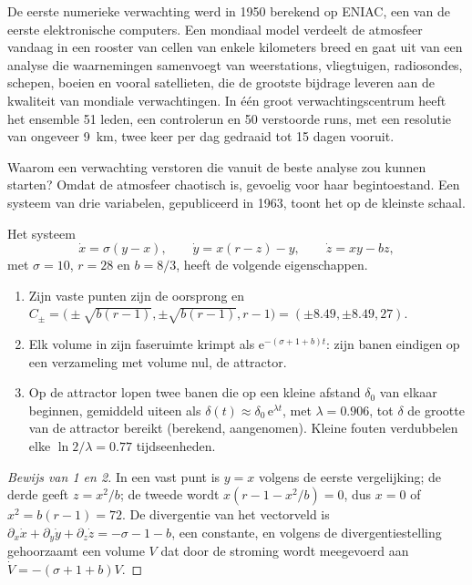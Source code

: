 De eerste numerieke verwachting werd in 1950 berekend op ENIAC, een van de eerste elektronische
computers. Een mondiaal model verdeelt de atmosfeer vandaag in een rooster van cellen van enkele kilometers
breed en gaat uit van een analyse die waarnemingen samenvoegt van weerstations, vliegtuigen,
radiosondes, schepen, boeien en vooral satellieten, die de grootste bijdrage leveren aan de
kwaliteit van mondiale verwachtingen. In één groot verwachtingscentrum heeft het ensemble
51 leden, een controlerun en 50 verstoorde runs, met een resolutie van ongeveer \qty{9}{km}, twee keer
per dag gedraaid tot 15 dagen vooruit.

Waarom een verwachting verstoren die vanuit de beste analyse zou kunnen starten? Omdat de atmosfeer
chaotisch is, gevoelig voor haar begintoestand. Een systeem van drie variabelen, gepubliceerd in 1963, toont het
op de kleinste schaal.

\begin{proposition}\label{prop:b2:weather-systems:lorenz}
Het systeem
\[
  \dot x = \sigma(y - x), \qquad \dot y = x(r - z) - y, \qquad \dot z = xy - bz,
\]
met $\sigma = 10$, $r = 28$ en $b = 8/3$, heeft de volgende eigenschappen.
\begin{enumerate}
  \item Zijn vaste punten zijn de oorsprong en $C_\pm = \bigl(\pm\sqrt{b(r - 1)}, \pm\sqrt{b(r - 1)},
        r - 1\bigr) = (\pm 8.49, \pm 8.49, 27)$.
  \item Elk volume in zijn faseruimte krimpt als $\mathrm{e}^{-(\sigma + 1 + b)t}$: zijn
        banen eindigen op een verzameling met volume nul, de attractor.
  \item Op de attractor lopen twee banen die op een kleine afstand $\delta_0$ van elkaar beginnen,
        gemiddeld uiteen als $\delta(t) \approx \delta_0\,\mathrm{e}^{\lambda t}$, met $\lambda =
        0.906$, tot $\delta$ de grootte van de attractor bereikt (berekend, aangenomen). Kleine
        fouten verdubbelen elke $\ln 2/\lambda = 0.77$ tijdseenheden.
\end{enumerate}
\end{proposition}

\begin{proof}[Bewijs van 1 en 2]
In een vast punt is $y = x$ volgens de eerste vergelijking; de derde geeft $z = x^2/b$; de tweede
wordt $x(r - 1 - x^2/b) = 0$, dus $x = 0$ of $x^2 = b(r - 1) = 72$. De divergentie van het
vectorveld is $\partial_x\dot x + \partial_y\dot y + \partial_z\dot z = -\sigma - 1 - b$, een
constante, en volgens de divergentiestelling gehoorzaamt een volume $V$ dat door de stroming wordt meegevoerd aan $\dot V =
-(\sigma + 1 + b)V$.
\end{proof}

